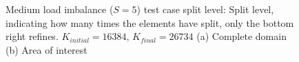 \begin{figure}[H]
	\centering
	\hfill
	\caption{Medium load imbalance (\(S = 5\)) test case split level: Split level, indicating how many times the elements have split, only the bottom right refines. \(K_{initial} = 16384\), \(K_{final} = 26734\) (a) Complete domain (b) Area of interest}\label{fig:load_imbalance_case_medium_s}
\end{figure}

